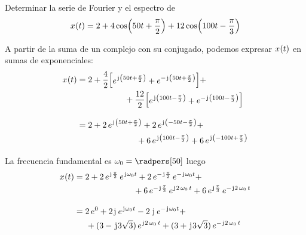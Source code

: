\begin{mdframed}[style=ExampleFrame]
    \begin{example}
    \end{example}
    Determinar la serie de Fourier y el espectro de
    \[
        \fx[x]{t} = 2 + 4 \fx[\cos]{50 t + \frac{\pi}{2}} + 12 \fx[\cos]{100 t - \frac{\pi}{3}}
    \]


    A partir de la suma de un complejo con su conjugado, podemos expresar $\fx[x]{t}$ en sumas de exponenciales:
    \begin{align*}
        \fx[x]{t}
        & = 2 + \frac{4}{2} \inBrackets{e^{\iu \inParentheses{50 t + \frac{\pi}{2}}} + e^{- \iu \inParentheses{50 t + \frac{\pi}{2}}}} +
        \notag
        \\
        & \hfill \hspace{2cm}
        + \frac{12}{2} \inBrackets{e^{\iu \inParentheses{100 t - \frac{\pi}{3}}} + e^{- \iu \inParentheses{100 t - \frac{\pi}{3}}}}
        \\[2ex]
        & = 2 + 2 \, e^{\iu \inParentheses{50 t + \frac{\pi}{2}}} + 2 \, e^{\iu \inParentheses{- 50 t - \frac{\pi}{2}}} +
        \notag
        \\
        & \hfill \hspace{2.5cm}
        + 6 \, e^{\iu \inParentheses{100 t - \frac{\pi}{3}}} + 6 \, e^{\iu \inParentheses{- 100 t + \frac{\pi}{3}}}
    \end{align*}

    La frecuencia fundamental es $\omega_0 = \radpers[50]$ luego
    \begin{align*}
        \fx[x]{t}
        & = 2 + 2 \, e^{\iu \frac{\pi}{2}} \, e^{\iu \omega_0 t} + 2 \, e^{- \iu \frac{\pi}{2}} \, e^{- \iu \omega_0 t} +
        \notag
        \\
        & \hfill \hspace{2.5cm}
        + 6 \, e^{- \iu \frac{\pi}{3}} \, e^{\iu 2 \, \omega_0 \, t} + 6 \, e^{\iu \frac{\pi}{3}} \, e^{- \iu 2 \, \omega_0 \, t}
        \\[2ex]
        & = 2 \, e^0 + 2 \iu \, e^{\iu \omega_0 t} - 2 \, \iu \, e^{- \iu \omega_0 t} +
        \\
        & \hfill \hspace{0.5cm}
        + (3 - \iu 3 \sqrt{3}) \, e^{\iu 2 \, \omega_0 \, t} + (3 + \iu 3 \sqrt{3}) \, e^{- \iu 2 \, \omega_0 \, t}
    \end{align*}


\end{mdframed}
